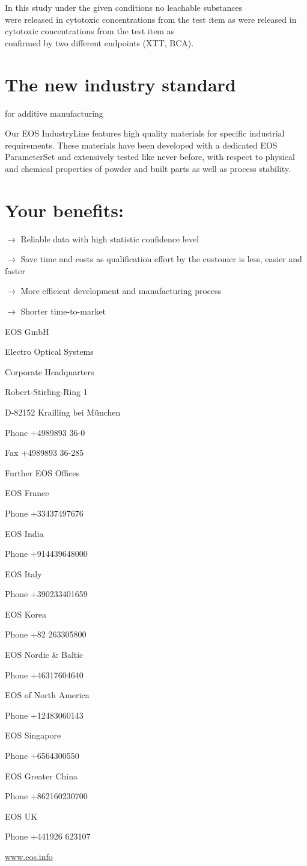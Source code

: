 \documentclass[10pt]{article}
\begin{document}
In this study under the given conditions no leachable substances\\
were released in cytotoxic concentrations from the test item as were released in cytotoxic concentrations from the test item as\\
confirmed by two different endpoints (XTT, BCA).

\section*{The new industry standard}
for additive manufacturing

Our EOS IndustryLine features high quality materials for specific industrial requirements. These materials have been developed with a dedicated EOS ParameterSet and extensively tested like never before, with respect to physical and chemical properties of powder and built parts as well as process stability.

\section*{Your benefits:}
$\rightarrow$ Reliable data with high statistic confidence level

$\rightarrow$ Save time and costs as qualification effort by the customer is less, easier and faster

$\rightarrow$ More efficient development and manufacturing process

$\rightarrow$ Shorter time-to-market

EOS GmbH

Electro Optical Systems

Corporate Headquarters

Robert-Stirling-Ring 1

D-82152 Krailling bei München

Phone +4989893 36-0

Fax +4989893 36-285

Further EOS Offices

EOS France

Phone +33437497676

EOS India

Phone +914439648000

EOS Italy

Phone +390233401659

EOS Korea

Phone +82 263305800

EOS Nordic \& Baltic

Phone +46317604640

EOS of North America

Phone +12483060143

EOS Singapore

Phone +6564300550

EOS Greater China

Phone +862160230700

EOS UK

Phone +441926 623107

\href{http://www.eos.info}{www.eos.info}
\end{document}
